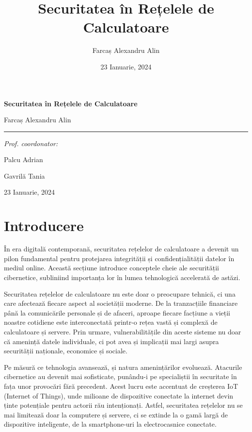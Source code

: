 \documentclass[12pt]{article}
\title{\vspace{-4cm} 
       \Huge Securitatea în Rețelele de Calculatoare}
\author{\Large Farcaș Alexandru Alin}
\date{\Large 23 Ianuarie, 2024}
\begin{document}
\begin{titlepage}
    \centering 
    \vspace*{1cm} 
    {\Huge\bfseries Securitatea în Rețelele de Calculatoare \par}
    \vspace{1.5cm}
    {\Large Farcaș Alexandru Alin\par}
    \vspace{2cm}
    
    \rule{\textwidth}{0.4pt}  %
    \vspace{0.5cm}
    
    {\Large\textit{Prof. coordonator:} \par}
    \vspace{0.25cm}
    {\Large Palcu Adrian \par}
    {\Large Gavrilă Tania \par}
    
    \vspace{2cm}
    {\Large 23 Ianuarie, 2024\par}
\end{titlepage}

\newpage
\tableofcontents
\newpage


\section{Introducere}
În era digitală contemporană, securitatea rețelelor de calculatoare a devenit un pilon fundamental pentru protejarea integrității și confidențialității datelor în mediul online. Această secțiune introduce conceptele cheie ale securității cibernetice, subliniind importanța lor în lumea tehnologică accelerată de astăzi.

Securitatea rețelelor de calculatoare nu este doar o preocupare tehnică, ci una care afectează fiecare aspect al societății moderne. De la tranzacțiile financiare până la comunicările personale și de afaceri, aproape fiecare facțiune a vieții noastre cotidiene este interconectată printr-o rețea vastă și complexă de calculatoare și servere. Prin urmare, vulnerabilitățile din aceste sisteme nu doar că amenință datele individuale, ci pot avea și implicații mai largi asupra securității naționale, economice și sociale.

Pe măsură ce tehnologia avansează, și natura amenințărilor evoluează. Atacurile cibernetice au devenit mai sofisticate, punându-i pe specialiștii în securitate în fața unor provocări fără precedent. Acest lucru este accentuat de creșterea IoT (Internet of Things), unde milioane de dispozitive conectate la internet devin ținte potențiale pentru actorii rău intenționați. Astfel, securitatea rețelelor nu se mai limitează doar la computere și servere, ci se extinde la o gamă largă de dispozitive inteligente, de la smartphone-uri la electrocasnice conectate.
\end{document}
